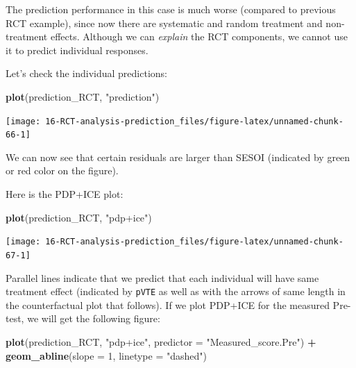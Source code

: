\documentclass[
]{book}
\newenvironment{Shaded}{\begin{snugshade}}{\end{snugshade}}
\newcommand{\DataTypeTok}[1]{\textcolor[rgb]{0.13,0.29,0.53}{#1}}
\newcommand{\DecValTok}[1]{\textcolor[rgb]{0.00,0.00,0.81}{#1}}
\newcommand{\KeywordTok}[1]{\textcolor[rgb]{0.13,0.29,0.53}{\textbf{#1}}}
\newcommand{\NormalTok}[1]{#1}
\newcommand{\OperatorTok}[1]{\textcolor[rgb]{0.81,0.36,0.00}{\textbf{#1}}}
\newcommand{\StringTok}[1]{\textcolor[rgb]{0.31,0.60,0.02}{#1}}
\begin{document}
The prediction performance in this case is much worse (compared to previous RCT example), since now there are systematic and random treatment and non-treatment effects. Although we can \emph{explain} the RCT components, we cannot use it to predict individual responses.

Let's check the individual predictions:

\begin{Shaded}
\begin{Highlighting}[]
\KeywordTok{plot}\NormalTok{(prediction\_RCT, }\StringTok{"prediction"}\NormalTok{)}
\end{Highlighting}
\end{Shaded}

\begin{center}\texttt{[image: 16-RCT-analysis-prediction\_files/figure-latex/unnamed-chunk-66-1]} \end{center}

We can now see that certain residuals are larger than SESOI (indicated by green or red color on the figure).

Here is the PDP+ICE plot:

\begin{Shaded}
\begin{Highlighting}[]
\KeywordTok{plot}\NormalTok{(prediction\_RCT, }\StringTok{"pdp+ice"}\NormalTok{)}
\end{Highlighting}
\end{Shaded}

\begin{center}\texttt{[image: 16-RCT-analysis-prediction\_files/figure-latex/unnamed-chunk-67-1]} \end{center}

Parallel lines indicate that we predict that each individual will have same treatment effect (indicated by \texttt{pVTE} as well as with the arrows of same length in the counterfactual plot that follows). If we plot PDP+ICE for the measured Pre-test, we will get the following figure:

\begin{Shaded}
\begin{Highlighting}[]
\KeywordTok{plot}\NormalTok{(prediction\_RCT, }\StringTok{"pdp+ice"}\NormalTok{, }\DataTypeTok{predictor =} \StringTok{"Measured\_score.Pre"}\NormalTok{) }\OperatorTok{+}
\StringTok{  }\KeywordTok{geom\_abline}\NormalTok{(}\DataTypeTok{slope =} \DecValTok{1}\NormalTok{, }\DataTypeTok{linetype =} \StringTok{"dashed"}\NormalTok{)}
\end{Highlighting}
\end{Shaded}
\end{document}
